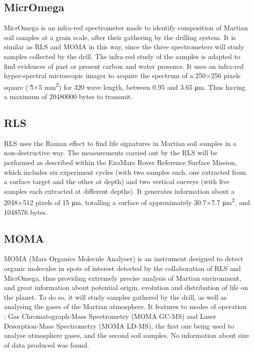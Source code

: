 \documentclass[12pt,a4paper]{article}
\begin{document}
\subsection{MicrOmega}

MicrOmega is an infra-red spectrometer made to identify composition of Martian soil samples at a grain scale, after their gathering by the drilling system. It is similar as RLS and MOMA in this way, since the three spectrometers will study samples collected by the drill. The infra-red study of the samples is adapted to find evidences of past or present carbon and water presence. 
It uses an infra-red hyper-spectral microscopic imager to acquire the spectrum of a 250$\times$256 pixels square (\char`\~5$\times$5 \si{\milli\metre^2}) for 320 wave length, between 0.95 and 3.65 \si{\micro\metre}. Thus having a maximum of \num{20480000} bytes to transmit.

\subsection{RLS}
RLS uses the Raman effect to find life signatures in Martian soil samples in a non-destructive way.
The measurements carried out by the RLS will be performed as described within the ExoMars Rover Reference Surface Mission, which includes six experiment cycles (with two samples each, one extracted from a surface target and the other at depth) and two vertical surveys (with five samples each extracted at different depths). It generates information about a 2048$\times$512 pixels of 15 \si{\micro\metre}, totalling a surface of approximately 30.7$\times$7.7 \si{\micro\metre^2}, and \num{1048576} bytes.

\subsection{MOMA}
MOMA (Mars Organics Molecule Analyser) is an instrument designed to detect organic molecules in spots of interest detected by the collaboration of RLS and MicrOmega, thus providing extremely precise analysis of Martian environment, and great information about potential origin, evolution and distribution of life on the planet. To do so, it will study samples gathered by the drill, as well as analysing the gases of the Martian atmosphere. It features to modes of operation : Gas Chromatograph-Mass Spectrometry (MOMA GC-MS) and Laser Desorption-Mass Spectrometry (MOMA LD-MS), the first one being used to analyse atmosphere gases, and the second soil samples. No information about size of data produced was found.
\end{document}
